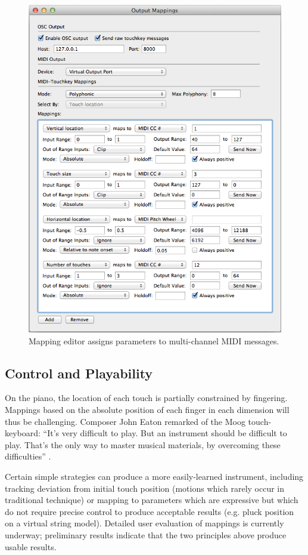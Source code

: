 \begin{figure}[t]
\centering
\includegraphics[width=0.85\columnwidth]{fig6_mappings2.png}
\caption{Mapping editor assigns parameters to multi-channel MIDI messages.}
\label{McPherson:fig:mapping}
\end{figure}

\subsection{Control and Playability}

On the piano, the location of each touch is partially constrained by fingering. Mappings based on the absolute position of each finger in each dimension will thus be challenging. Composer John Eaton remarked of the Moog touch-keyboard: ``It's very difficult to play. But an instrument should be difficult to play. That's the only way to master musical materials, by overcoming these difficulties'' \cite{Star-Ledger:2006}. 

Certain simple strategies can produce a more easily-learned instrument, including tracking deviation from initial touch position (motions which rarely occur in traditional technique) or mapping to parameters which are expressive but which do not require precise control to produce acceptable results (e.g. pluck position on a virtual string model). Detailed user evaluation of mappings is currently underway; preliminary results indicate that the two principles above produce usable results.


